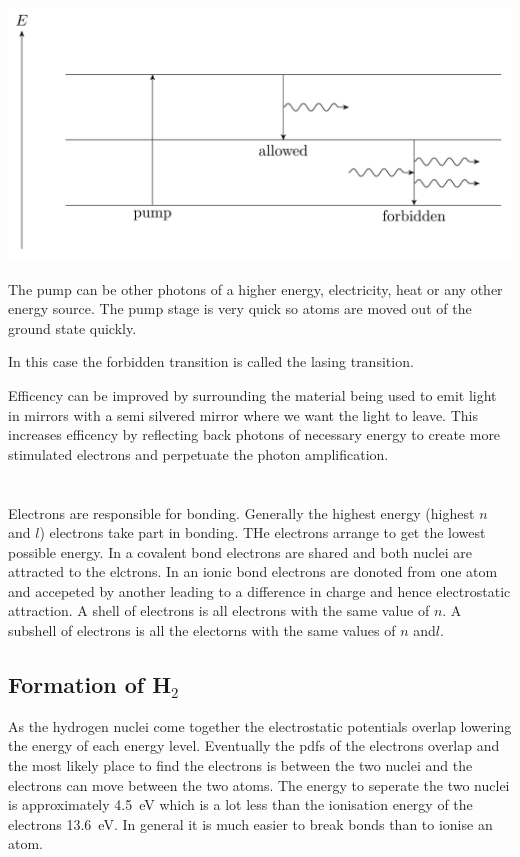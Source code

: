 \documentclass{article}
\begin{document}
\begin{center}
\includegraphics[scale=0.3]{LasingEnergyLevels}
\end{center}

The pump can be other photons of a higher energy, electricity, heat or any other energy source. The pump stage is very quick so atoms are moved out of the ground state quickly.

In this case the forbidden transition is called the lasing transition.

Efficency can be improved by surrounding the material being used to emit light in mirrors with a semi silvered mirror where we want the light to leave. This increases efficency by reflecting back photons of necessary energy to create more stimulated electrons and perpetuate the photon amplification.

\section{}

Electrons are responsible for bonding. Generally the highest energy (highest \(n\) and \(l\)) electrons take part in bonding. THe electrons arrange to get the lowest possible energy. In a covalent bond electrons are shared and both nuclei are attracted to the elctrons. In an ionic bond electrons are donoted from one atom and accepeted by another leading to a difference in charge and hence electrostatic attraction. A shell of electrons is all electrons with the same value of \(n\). A subshell of electrons is all the electorns with the same values of \(n\) and\(l\). 

\subsection*{Formation of H\(_2\)}

As the hydrogen nuclei come together the electrostatic potentials overlap lowering the energy of each energy level. Eventually the pdfs of the electrons overlap and the most likely place to find the electrons is between the two nuclei and the electrons can move between the two atoms. The energy to seperate the two nuclei is approximately \SI{4.5}{eV} which is a lot less than the ionisation energy of the electrons \SI{13.6}{eV}. In general it is much easier to break bonds than to ionise an atom.
\end{document}
